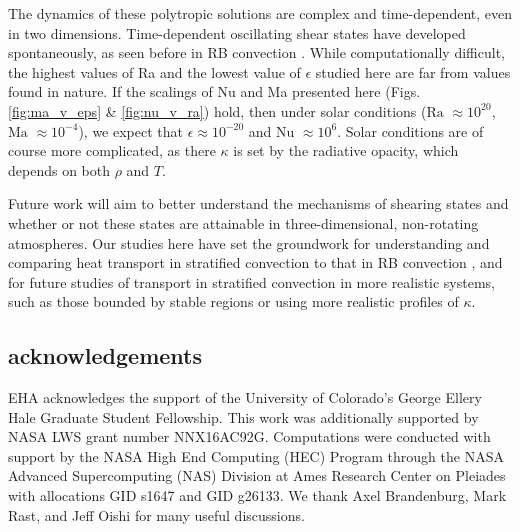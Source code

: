 \documentclass[aps, prl, twocolumn, nofootinbib, groupedaddress, amsfonts, amssymb, amsmath]{revtex4-1}
\begin{document}
The dynamics of these polytropic solutions are complex and time-dependent, even in two dimensions.
Time-dependent oscillating shear states have developed spontaneously, as seen before in RB convection
\cite{goluskin&all2014}.  While computationally difficult, the highest values of Ra and the lowest value
of $\epsilon$ studied here are far from values found in nature.  If the scalings of Nu and Ma
presented here (Figs. \ref{fig:ma_v_eps} \& \ref{fig:nu_v_ra}) hold, then under solar conditions ($\text{Ra }\approx 10^{20}$, $\text{Ma }\approx 10^{-4}$), we expect that $\epsilon \approx 10^{-20}$ and
$\text{Nu }\approx 10^{6}$.  
Solar conditions are of course more complicated, as there $\kappa$ is
set by the radiative opacity, which depends on both $\rho$ and $T$.

Future work will aim to better understand the mechanisms of shearing states and
whether or not these states are attainable in three-dimensional, non-rotating atmospheres.  Our studies
here have set the groundwork for understanding and comparing heat transport in stratified convection
to that in RB convection \cite{johnston&doering2009}, and for future studies of transport in stratified
convection in more realistic systems, such as those bounded by stable regions \cite{hurlburt&all1986} or 
using more realistic profiles of $\kappa$.



\subsection{acknowledgements}
EHA acknowledges the support of the University of Colorado's George 
Ellery Hale Graduate Student Fellowship.
This work was additionally supported by  NASA LWS grant number NNX16AC92G.  
Computations were conducted 
with support by the NASA High End Computing (HEC) Program through the NASA 
Advanced Supercomputing (NAS) Division at Ames Research Center on Pleiades
with allocations GID s1647 and GID g26133.
We thank Axel Brandenburg, Mark Rast, and Jeff Oishi for many useful discussions.


\end{document}
